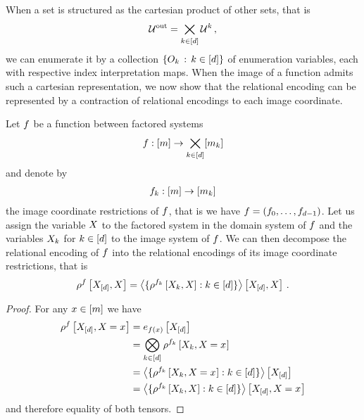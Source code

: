 
When a set is structured as the cartesian product of other sets, that is
\begin{align*}
	\mathcal{U}^{\mathrm{out}} = \bigtimes_{k\in[d]} \mathcal{U}^{k} \, ,
\end{align*}
we can enumerate it by a collection $\{O_{k} \, : \, k\in[d]\}$ of enumeration variables, each with respective index interpretation maps.
When the image of a function admits such a cartesian representation, we now show that the relational encoding can be represented by a contraction of relational encodings to each image coordinate.

\begin{theorem}\label{the:functionImageDecompositionContraction}
	Let $f$ be a function between factored systems
	\begin{align*}
		f : [m] \rightarrow  \bigtimes_{k\in[d]}[m_{k}]
	\end{align*}
	and denote by
	\begin{align*}
		f_{k} : [m] \rightarrow [m_{k}]
	\end{align*}
	the image coordinate restrictions of $f$, that is we have $f=(f_{0},\ldots,f_{d-1})$.
	Let us assign the variable $X$ to the factored system in the domain system of $f$ and the variables $X_{k}$ for $k\in[d]$ to the image system of $f$.
	We can then decompose the relational encoding of $f$ into the relational encodings of its image coordinate restrictions, that is
	\begin{align*}
		\rho^{f}\left[X_{[d]},X\right]
		= \left\langle 
		\{\rho^{f_{k}}\left[X_{k},X\right] : k\in[d] \}
		\right\rangle \left[ X_{[d]},X \right] \, .
	\end{align*}
\end{theorem}
\begin{proof}
	For any $x\in[m]$ we have
	\begin{align*}
		\rho^{f}\left[X_{[d]},X_{}=x_{}\right]
		&= e_{f(x)}\left[X_{[d]}\right] \\
		&= \bigotimes_{k\in[d]} \rho^{f_{k}}\left[X_{k},X_{}=x_{}\right] \\
		&= \left\langle 
		\{\rho^{f_{k}}\left[X_{k},X_{}=x_{}\right] : k\in[d]\}
		\right\rangle \left[ X_{[d]} \right] \\
		&= \left\langle 
		\{\rho^{f_{k}}\left[X_{k},X\right] : k\in[d]\}
		\right\rangle \left[ X_{[d]},X_{}=x_{} \right]
	\end{align*}
	and therefore equality of both tensors.
\end{proof}

